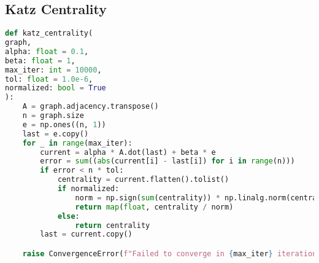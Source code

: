 \documentclass{article}
\begin{document}
\subsection*{Katz Centrality}
\linespread{1}
\begin{lstlisting}[language=Python]
def katz_centrality(
graph,
alpha: float = 0.1,
beta: float = 1,
max_iter: int = 10000,
tol: float = 1.0e-6,
normalized: bool = True
):
    A = graph.adjacency.transpose()
    n = graph.size
    e = np.ones((n, 1))
    last = e.copy()
    for _ in range(max_iter):
        current = alpha * A.dot(last) + beta * e
        error = sum((abs(current[i] - last[i]) for i in range(n)))
        if error < n * tol:
            centrality = current.flatten().tolist()
            if normalized:
                norm = np.sign(sum(centrality)) * np.linalg.norm(centrality)
                return map(float, centrality / norm)
            else:
                return centrality
        last = current.copy()

    raise ConvergenceError(f"Failed to converge in {max_iter} iterations.")
\end{lstlisting}
\end{document}
